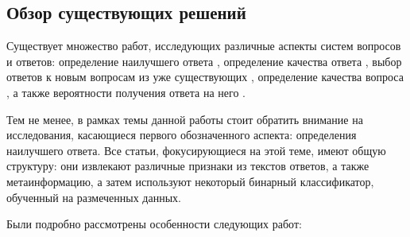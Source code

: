 \documentclass[../diploma.tex]{subfiles}
\begin{document}
	\label{sec:subject_area}

	\subsection{Обзор существующих решений}
   
	\label{subsec:existing_solutions}

	Существует множество работ, исследующих различные аспекты систем вопросов и ответов: 
	определение наилучшего ответа \cite{article:burel2012, article:tian2013, article:gkotsis2014}, 
	определение качества ответа \cite{article:agichtein2008, article:chua2013}, 
	выбор ответов к новым вопросам из уже существующих \cite{article:berger2000, article:surdeanu2008, article:jeon2006}, 
	определение качества вопроса \cite{article:agichtein2008, article:li2012}, 
	а также вероятности получения ответа на него \cite{article:agichtein2009}. 

	Тем не менее, в рамках темы данной работы стоит обратить внимание на исследования, касающиеся первого обозначенного аспекта: определения наилучшего ответа.
	Все статьи, фокусирующиеся на этой теме, имеют общую структуру: они извлекают различные признаки из текстов ответов, а также метаинформацию, 
	а затем используют некоторый бинарный классификатор, обученный на размеченных данных.

	Были подробно рассмотрены особенности следующих работ:
\end{document}
